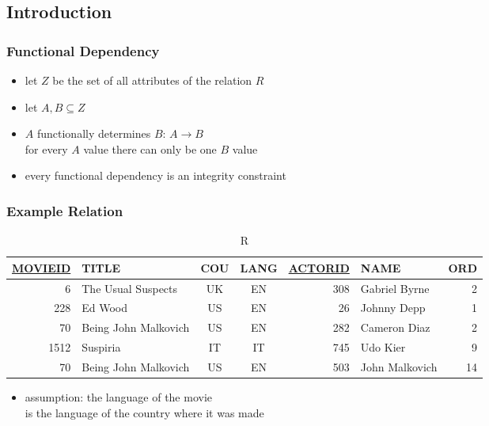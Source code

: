 \documentclass[dvipsnames]{beamer}
\begin{document}
\subsection{Introduction}

\begin{frame}
  \frametitle{Functional Dependency}

  \begin{itemize}
    \item let $Z$ be the set of all attributes of the relation $R$
    \item let $A,B \subseteq Z$
    \item \alert{$A$ functionally determines $B$}: $A \rightarrow B$\\
      for every $A$ value there can only be one $B$ value

    \pause
    \medskip
    \item every functional dependency is an integrity constraint
  \end{itemize}
\end{frame}

\begin{frame}[label=example_db_1]
  \frametitle{Example Relation}

  \begin{tiny}
  \begin{table}
    \caption{R}
    \begin{tabular}{|r|l|c|c|r|l|r|}\hline
\underline{MOVIEID} & TITLE    & COU & LANG & \underline{ACTORID} & NAME & ORD\\[2pt]\hline\hline
      6 & The Usual Suspects   & UK  &  EN  &     308 & Gabriel Byrne    &   2\\\hline
    228 & Ed Wood              & US  &  EN  &      26 & Johnny Depp      &   1\\\hline
     70 & Being John Malkovich & US  &  EN  &     282 & Cameron Diaz     &   2\\\hline
   1512 & Suspiria             & IT  &  IT  &     745 & Udo Kier         &   9\\\hline
     70 & Being John Malkovich & US  &  EN  &     503 & John Malkovich   &  14\\\hline
    \end{tabular}
  \end{table}
  \end{tiny}

  \pause
  \begin{itemize}
    \item assumption: the language of the movie\\
      is the language of the country where it was made
  \end{itemize}
\end{frame}
\end{document}
